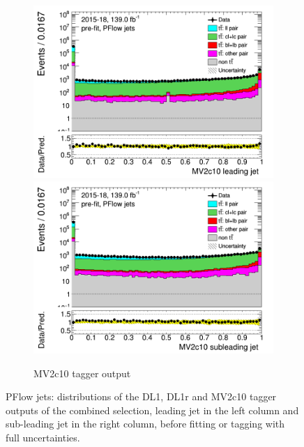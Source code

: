 \begin{figure}[H]
\begin{subfigure}[t]{1\linewidth}
	\end{subfigure}
	\begin{subfigure}[t]{1\linewidth}
	\includegraphics[width=.45\textwidth]{FTAG_plots/pretagNoRwwithhighpTPFlowall/DataMC_h_J0_MV2c10_log.png}
	\includegraphics[width=.45\textwidth]{FTAG_plots/pretagNoRwwithhighpTPFlowall/DataMC_h_J1_MV2c10_log.png}\\
	\caption{MV2c10 tagger output}
	\end{subfigure}
	\caption{PFlow jets: distributions of the DL1, DL1r and MV2c10 
	tagger outputs of the combined selection, 
	leading jet in the left column and sub-leading jet in the right column,
	before fitting or tagging with full uncertainties.} \label{fig:taggers_PFlow}
\end{figure}
\newpage
